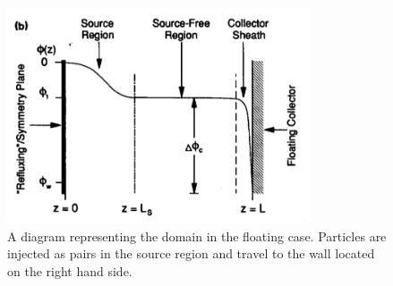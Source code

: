\documentclass[12pt]{article}
\begin{document}
\begin{figure}[H]
\centering
\includegraphics[width=0.8\textwidth]{float_setup}
\caption{A diagram representing the domain in the floating case. Particles are injected as pairs in the source region and travel to the wall located on the right hand side. \cite{float_diagram}}
\end{figure}
\end{document}
